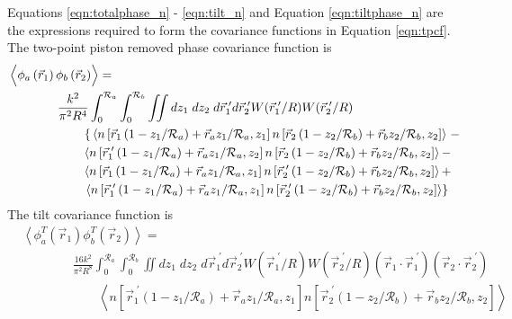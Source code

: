 Equations \ref{eqn:totalphase_n} - \ref{eqn:tilt_n} and Equation
\ref{eqn:tiltphase_n} are the expressions required to form the covariance
functions in Equation \ref{eqn:tpcf}.  The two-point piston removed phase
covariance function is
\begin{equation}\label{eqn:prphase_n}
\begin{aligned}
&\left\langle \vphantom{\hat{\phi}_{a}} \phi_{a}\left(\vec{r}_{1}\right) \phi_{b}\left(\vec{r}_{2}\right)\right\rangle = \\
&\quad\quad\quad\quad
\frac{k^{2}}{\pi^{2}R^{4}} \int_{0}^{\mathcal{R}_{a}}  \int_{0}^{\mathcal{R}_{b}} \iint dz_{1} \; dz_{2} \; d\vec{r}^{\;\prime}_{1}d\vec{r}^{\;\prime}_{2} W(\vec{r}^{\;\prime}_{1}/R) W(\vec{r}^{\;\prime}_{2}/R) \\
&\quad\quad\quad\quad\quad\quad
\left\{\vphantom{\vec{r}^{\;\prime}_{1}}
\left\langle n\left[\vec{r}_{1}\left(1-z_{1}/\mathcal{R}_{a}\right) + \vec{r}_{a} z_{1}/\mathcal{R}_{a}, z_{1}\right]
 n\left[\vec{r}_{2}\left(1-z_{2}/\mathcal{R}_{b}\right) + \vec{r}_{b} z_{2}/\mathcal{R}_{b}, z_{2}\right] \right\rangle\right. -
\\
&\quad\quad\quad\quad\quad\quad
\left\langle n\left[\vec{r}^{\;\prime}_{1}\left(1-z_{1}/\mathcal{R}_{a}\right) + \vec{r}_{a} z_{1}/\mathcal{R}_{a}, z_{2}\right]
 n\left[\vec{r}_{2}\left(1-z_{2}/\mathcal{R}_{b}\right) + \vec{r}_{b} z_{2}/\mathcal{R}_{b}, z_{2}\right] \right\rangle -
\\
&\quad\quad\quad\quad\quad\quad
\left\langle n\left[\vec{r}_{1}\left(1-z_{1}/\mathcal{R}_{a}\right) + \vec{r}_{a} z_{1}/\mathcal{R}_{a}, z_{1}\right]
 n\left[\vec{r}^{\;\prime}_{2}\left(1-z_{2}/\mathcal{R}_{b}\right) + \vec{r}_{b} z_{2}/\mathcal{R}_{b}, z_{2}\right] \right\rangle +
\\
&\quad\quad\quad\quad\quad\quad
\left.
\left\langle n\left[\vec{r}^{\;\prime}_{1}\left(1-z_{1}/\mathcal{R}_{a}\right) + \vec{r}_{a} z_{1}/\mathcal{R}_{a}, z_{1}\right]
 n\left[\vec{r}^{\;\prime}_{2}\left(1-z_{2}/\mathcal{R}_{b}\right) + \vec{r}_{b} z_{2}/\mathcal{R}_{b}, z_{2}\right] \right\rangle
\right\}
\end{aligned}
\end{equation}
The tilt covariance function is
\begin{equation}\label{eqn:tphase_n}
\begin{aligned}
&\left\langle \phi^{T}_{a}\left(\vec{r}_{1}\right) \phi^{T}_{b}\left(\vec{r}_{2}\right)\right\rangle = \\
&\quad\quad\quad\quad
\frac{16 k^{2}}{\pi^{2}R^{8}} \int_{0}^{\mathcal{R}_{a}}  \int_{0}^{\mathcal{R}_{b}} \iint dz_{1} \; dz_{2} \; d\vec{r}^{\;\prime}_{1}d\vec{r}^{\;\prime}_{2} W(\vec{r}^{\;\prime}_{1}/R) W(\vec{r}^{\;\prime}_{2}/R)
\left(\vec{r}_{1} \cdot \vec{r}^{\;\prime}_{1}\right)
\left(\vec{r}_{2} \cdot \vec{r}^{\;\prime}_{2}\right)
\\
&\quad\quad\quad\quad\quad\quad
\left\langle n\left[\vec{r}^{\;\prime}_{1}\left(1-z_{1}/\mathcal{R}_{a}\right) + \vec{r}_{a} z_{1}/\mathcal{R}_{a}, z_{1}\right]
 n\left[\vec{r}^{\;\prime}_{2}\left(1-z_{2}/\mathcal{R}_{b}\right) + \vec{r}_{b} z_{2}/\mathcal{R}_{b}, z_{2}\right] \right\rangle
\end{aligned}
\end{equation}
